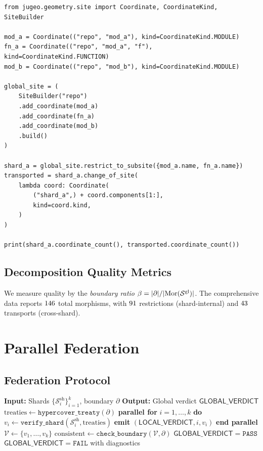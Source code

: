 \documentclass[11pt]{article}
\newcommand{\ShardSite}{\mathcal{S}^{\mathrm{sh}}}
\newcommand{\GlobalSite}{\mathcal{S}^{\mathrm{gl}}}
\newcommand{\LocalVerdict}{\ensuremath{\mathsf{LOCAL\_VERDICT}}}
\newcommand{\GlobalVerdict}{\ensuremath{\mathsf{GLOBAL\_VERDICT}}}
\begin{document}
\begin{lstlisting}[style=jugeo-python]
from jugeo.geometry.site import Coordinate, CoordinateKind, SiteBuilder

mod_a = Coordinate(("repo", "mod_a"), kind=CoordinateKind.MODULE)
fn_a = Coordinate(("repo", "mod_a", "f"), kind=CoordinateKind.FUNCTION)
mod_b = Coordinate(("repo", "mod_b"), kind=CoordinateKind.MODULE)

global_site = (
    SiteBuilder("repo")
    .add_coordinate(mod_a)
    .add_coordinate(fn_a)
    .add_coordinate(mod_b)
    .build()
)

shard_a = global_site.restrict_to_subsite({mod_a.name, fn_a.name})
transported = shard_a.change_of_site(
    lambda coord: Coordinate(
        ("shard_a",) + coord.components[1:],
        kind=coord.kind,
    )
)

print(shard_a.coordinate_count(), transported.coordinate_count())
\end{lstlisting}

\subsection{Decomposition Quality Metrics}
We measure quality by the \emph{boundary ratio}
$\beta = |\partial| / |\Mor(\GlobalSite)|$.  The comprehensive data
reports $146$ total morphisms, with $91$
restrictions (shard-internal) and $43$ transports
(cross-shard).

\section{Parallel Federation}\label{sec:federation}

\subsection{Federation Protocol}

\begin{algorithm}[H]
\caption{Parallel Federation Protocol}
\label{alg:federation}
\begin{algorithmic}[1]
\STATE \textbf{Input:} Shards $\{\ShardSite_i\}_{i=1}^k$, boundary
       $\partial$
\STATE \textbf{Output:} Global verdict $\GlobalVerdict$
\STATE $\text{treaties} \gets \texttt{hypercover\_treaty}(\partial)$
\STATE \textbf{parallel for} $i = 1, \ldots, k$ \textbf{do}
  \STATE \quad $v_i \gets \texttt{verify\_shard}(\ShardSite_i, \text{treaties})$
  \STATE \quad \textbf{emit} $(\LocalVerdict, i, v_i)$
\STATE \textbf{end parallel}
\STATE $\mathcal{V} \gets \{v_1, \ldots, v_k\}$
\STATE $\text{consistent} \gets \texttt{check\_boundary}(\mathcal{V}, \partial)$
  \RETURN $\GlobalVerdict = \texttt{PASS}$
\ELSE
  \RETURN $\GlobalVerdict = \texttt{FAIL}$ with diagnostics
\ENDIF
\end{algorithmic}
\end{algorithm}
\end{document}

